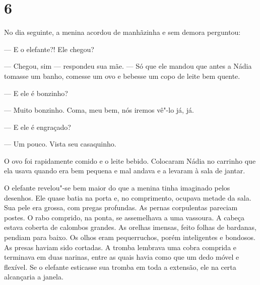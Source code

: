 \section{6}

No dia seguinte, a menina acordou de manhãzinha e sem demora perguntou:

--- E o elefante?! Ele chegou?

--- Chegou, sim --- respondeu sua mãe. --- Só que ele mandou que antes a
Nádia tomasse um banho, comesse um ovo e bebesse um copo de leite
bem quente.

--- E ele é bonzinho?

--- Muito bonzinho. Coma, meu bem, nós iremos vê"-lo já, já.

--- E ele é engraçado?

--- Um pouco. Vista seu casaquinho.

O ovo foi rapidamente comido e o leite bebido. Colocaram Nádia no
carrinho que ela usava quando era bem pequena e mal andava e a levaram à
sala de jantar.

O elefante revelou"-se bem maior do que a menina tinha imaginado pelos desenhos. Ele quase batia na porta e, no comprimento,
ocupava metade da sala. Sua pele era grossa, com pregas profundas. As
pernas corpulentas pareciam postes. O rabo comprido, na ponta, se
assemelhava a uma vassoura. A cabeça estava coberta de calombos
grandes. As orelhas imensas, feito folhas de bardanas, pendiam para
baixo. Os olhos eram pequerruchos, porém inteligentes e bondosos. As
presas haviam sido cortadas. A tromba lembrava uma cobra comprida e
terminava em duas narinas, entre as quais havia como que um dedo móvel e
flexível. Se o elefante esticasse sua tromba em toda a extensão, ele na
certa alcançaria a janela.

